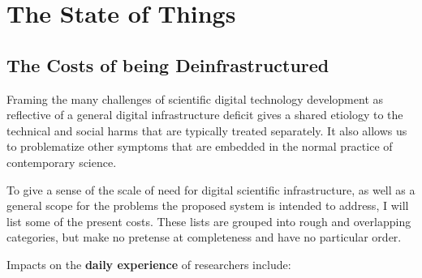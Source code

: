 \documentclass[10pt]{tufte-book}
\begin{document}
\section{The State of Things}


\subsection{The Costs of being
Deinfrastructured}





Framing the many challenges of scientific digital technology development
as reflective of a general digital infrastructure deficit gives a shared
etiology to the technical and social harms that are typically treated
separately. It also allows us to problematize other symptoms that are
embedded in the normal practice of contemporary science.

To give a sense of the scale of need for digital scientific
infrastructure, as well as a general scope for the problems the proposed
system is intended to address, I will list some of the present costs.
These lists are grouped into rough and overlapping categories, but make
no pretense at completeness and have no particular order.

Impacts on the \textbf{daily experience} of researchers include:
\end{document}
